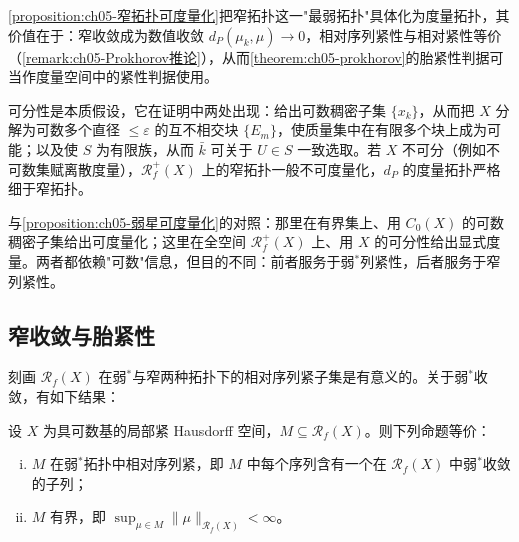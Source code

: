 \documentclass[../../main.tex]{subfiles}%
\begin{document}
\begin{remark}\label{remark:ch05-窄拓扑可度量化动机}
\cref{proposition:ch05-窄拓扑可度量化}把窄拓扑这一"最弱拓扑"具体化为度量拓扑，其价值在于：窄收敛成为数值收敛 $d_P(\mu_k,\mu)\to0$，相对序列紧性与相对紧性等价（\cref{remark:ch05-Prokhorov推论}），从而\cref{theorem:ch05-prokhorov}的胎紧性判据可当作度量空间中的紧性判据使用。

可分性是本质假设，它在证明中两处出现：给出可数稠密子集 $\{x_k\}$，从而把 $X$ 分解为可数多个直径 $\leqslant\varepsilon$ 的互不相交块 $\{E_m\}$，使质量集中在有限多个块上成为可能；以及使 $S$ 为有限族，从而 $\bar{k}$ 可关于 $U\in S$ 一致选取。若 $X$ 不可分（例如不可数集赋离散度量），$\mathscr{R}^+_f(X)$ 上的窄拓扑一般不可度量化，$d_P$ 的度量拓扑严格细于窄拓扑。

与\cref{proposition:ch05-弱星可度量化}的对照：那里在有界集上、用 $C_0(X)$ 的可数稠密子集给出可度量化；这里在全空间 $\mathscr{R}^+_f(X)$ 上、用 $X$ 的可分性给出显式度量。两者都依赖"可数"信息，但目的不同：前者服务于弱$^*$列紧性，后者服务于窄列紧性。
\end{remark}

\subsection{窄收敛与胎紧性}\label{subsection:ch05-窄收敛与胎紧性}

刻画 $\mathscr{R}_f(X)$ 在弱$^*$与窄两种拓扑下的相对序列紧子集是有意义的。关于弱$^*$收敛，有如下结果：

\begin{theorem}\label{theorem:ch05-弱星紧性}
\label{theorem:ch05-弱星紧}
设 $X$ 为具可数基的局部紧 Hausdorff 空间，$M\subseteq\mathscr{R}_f(X)$。则下列命题等价：
\begin{enumerate}[(i)]
\item\label{item:ch05-wstar-i} $M$ 在弱$^*$拓扑中相对序列紧，即 $M$ 中每个序列含有一个在 $\mathscr{R}_f(X)$ 中弱$^*$收敛的子列；
\item\label{item:ch05-wstar-ii} $M$ 有界，即 $\sup_{\mu\in M}\|\mu\|_{\mathscr{R}_f(X)}<\infty$。
\end{enumerate}
\end{theorem}
\end{document}
